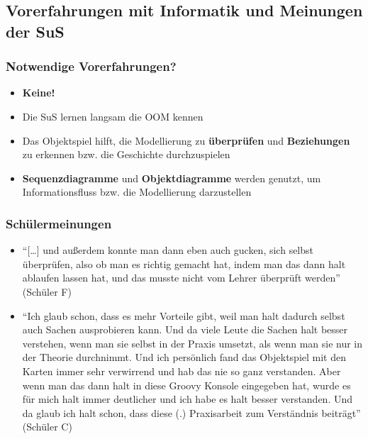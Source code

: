 \documentclass[usenames,dvipsnames]{beamer}
\begin{document}

\subsection{Vorerfahrungen mit Informatik und Meinungen der SuS}


\begin{frame}
\frametitle{Notwendige Vorerfahrungen?}
\begin{itemize}
\item \textbf{Keine!} 
\item Die SuS lernen langsam die OOM kennen
\item Das Objektspiel hilft, die Modellierung zu \textbf{überprüfen} und \textbf{Beziehungen} zu erkennen bzw. die Geschichte durchzuspielen
\item \textbf{Sequenzdiagramme} und \textbf{Objektdiagramme} werden genutzt, um Informationsfluss bzw. die Modellierung darzustellen
\end{itemize}
\end{frame}


\begin{frame}
\frametitle{Schülermeinungen}
\begin{itemize}
\item \enquote{[\dots] und außerdem konnte man dann eben auch gucken, sich selbst überprüfen, also ob man es richtig gemacht hat, indem man das dann halt ablaufen lassen hat, und das musste nicht vom Lehrer überprüft werden} (Schüler F)

\item \enquote{Ich glaub schon, dass es mehr Vorteile gibt, weil man halt dadurch selbst auch Sachen ausprobieren kann. Und da viele Leute die Sachen halt besser verstehen, wenn man sie selbst in der Praxis umsetzt, als wenn man sie nur in der Theorie durchnimmt. Und ich persönlich fand das Objektspiel mit den Karten immer sehr verwirrend und hab das nie so ganz verstanden. Aber wenn man das dann halt in diese Groovy Konsole eingegeben hat, wurde es für mich halt immer deutlicher und ich habe es halt besser verstanden. Und da glaub ich halt schon, dass diese (.) Praxisarbeit zum Verständnis beiträgt} (Schüler C)
\end{itemize}
\end{frame}
\end{document}
